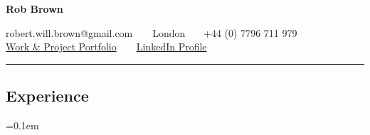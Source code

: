 \documentclass[10pt,a4paper]{article}
\begin{document}
\begin{center}
{\LARGE \textbf{Rob Brown}}

robert.will.brown@gmail.com\ \ \textbullet\ \ London \ \textbullet\ \ +44 (0) 7796 711 979
\\
\href{https://robert-will-brown.github.io}{Work \& Project Portfolio}\ \ \textbullet\ \ \href{https://www.linkedin.com/in/robert-w-brown/}{LinkedIn Profile}
\end{center}

\hrule
\vspace{-0.4em}
\subsection*{Experience}

\begin{itemize}
	\parskip=0.1em


\end{itemize}
\end{document}
